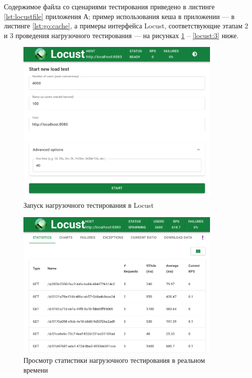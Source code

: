Содержимое файла со сценариями тестирования приведено в листинге \ref{lst:locustfile} приложения А; пример использования кеша в приложении --- в листинге \ref{lst:go:cache}, а примеры интерфейса Locust, соответствующие этапам 2 и 3 проведения нагрузочного тестирования --- на рисунках \ref{locust:1} -- \ref{locust:3} ниже.

\begin{figure}[H]
	\centering
	\includegraphics[width=0.9\textwidth]{img/locust-scr-1.png}
	\caption{Запуск нагрузочного тестирования в Locust}
	\label{locust:1}
\end{figure}

\begin{figure}[H]
	\centering
	\includegraphics[width=0.9\textwidth]{img/locust-scr-2.png}
	\caption{Просмотр статистики нагрузочного тестирования в реальном времени}
	\label{locust:2}
\end{figure}


